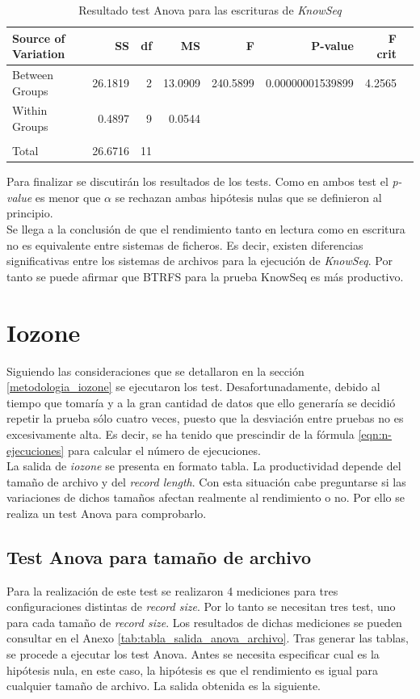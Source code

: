 \begin{table}[!htp]\centering
\scriptsize
\begin{tabular}{lrrrrrrr}\toprule
Source of Variation &SS &df &MS &F &P-value &F crit \\\midrule
Between Groups &26.1819 &2 &13.0909 &240.5899 &0.00000001539899 &4.2565 \\
Within Groups &0.4897 &9 &0.0544 & & & \\
& & & & & & \\
Total &26.6716 &11 & & & & \\
\bottomrule
\end{tabular}
\caption{Resultado test Anova para las escrituras de \textit{KnowSeq}}\label{tab: }
\end{table}

Para finalizar se discutirán los resultados de los tests. Como en ambos test el \textit{p-value} es menor que $\alpha$ se rechazan ambas hipótesis nulas que se definieron al principio.\\

Se llega a la conclusión de que el rendimiento tanto en lectura como en escritura no es equivalente entre sistemas de ficheros. Es decir, existen diferencias significativas entre los sistemas de archivos para la ejecución de \textit{KnowSeq}. Por tanto se puede afirmar que BTRFS para la prueba KnowSeq es más productivo.

\section{Iozone}
Siguiendo las consideraciones que se detallaron en la sección \ref{metodologia_iozone} se ejecutaron los test. Desafortunadamente, debido al tiempo que tomaría y a la gran cantidad de datos que ello generaría se decidió repetir la prueba sólo cuatro veces, puesto que la desviación entre pruebas no es excesivamente alta. Es decir, se ha tenido que prescindir de la fórmula \ref{eqn:n-ejecuciones} para calcular el número de ejecuciones.\\

La salida de \textit{iozone} se presenta en formato tabla. La productividad depende del tamaño de archivo y del \textit{record length}. Con esta situación cabe preguntarse si las variaciones de dichos tamaños afectan realmente al rendimiento o no. Por ello se realiza un test Anova para comprobarlo.

\subsection{Test Anova para tamaño de archivo}
Para la realización de este test se realizaron 4 mediciones para tres configuraciones distintas de \textit{record size}. Por lo tanto se necesitan tres test, uno para cada tamaño de \textit{record size}.  Los resultados de dichas mediciones se pueden consultar en el Anexo \ref{tab:tabla_salida_anova_archivo}. Tras generar las tablas, se procede a ejecutar los test Anova. Antes se necesita especificar cual es la hipótesis nula, en este caso, la hipótesis es que el rendimiento es  igual para cualquier tamaño de archivo. La salida obtenida es la siguiente. 

